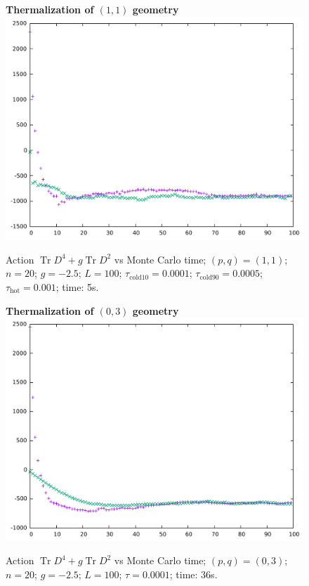\documentclass[12pt,a4paper]{article}
\DeclareMathOperator{\Tr}{Tr}
\begin{document}
\begin{figure}[!htb]
\centering
\textbf{Thermalization of $(1,1)$ geometry}
\includegraphics[width=1\linewidth]{p1q1n20g25.pdf}
\caption{Action $\Tr D^4 + g\Tr D^2$ vs Monte Carlo time; $(p,q)=(1,1)$; $n=20$; $g=-2.5$; $L=100$; $\tau_\text{cold10} = 0.0001$; $\tau_\text{cold90} = 0.0005$; $\tau_\text{hot} = 0.001$; time: 5s.}
\end{figure}

\begin{figure}[!htb]
\centering
\textbf{Thermalization of $(0,3)$ geometry}
\includegraphics[width=1\linewidth]{p0q3n20g25.pdf}
\caption{Action $\Tr D^4 + g\Tr D^2$ vs Monte Carlo time; $(p,q)=(0,3)$; $n=20$; $g=-2.5$; $L=100$; $\tau = 0.0001$; time: 36s.}
\end{figure}
\end{document}
